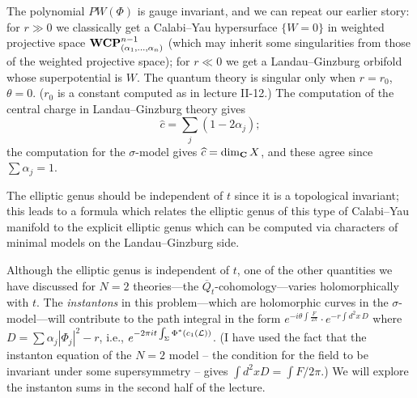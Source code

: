The polynomial $PW(\Phi)$ is gauge invariant, and we can repeat our earlier
story:  for $r\gg0$ we classically
get a Calabi--Yau hypersurface $\{W=0\}$ in weighted projective space ${\bf
WCP}^{n-1}_{(\alpha_1,\dots,\alpha_n)}$
(which may inherit some singularities
from those of the weighted projective space); for $r\ll0$ we get a
Landau--Ginzburg orbifold whose
superpotential is $W$.  The quantum theory is singular only when $r=r_0$,
$\theta=0$.  ($r_0$ is
a constant computed as in lecture II-12.)
The computation of the central charge in Landau--Ginzburg theory gives
$$\widehat{c}=\sum_j(1-2\alpha_j);$$
the computation for the $\sigma$-model gives $\widehat{c}=\dim_{\bf C}X$, and
these agree since
$\sum\alpha_j=1$.

\centerline{\quad}
\centerline{\epsfysize=1.35in}
\centerline{\quad}


The elliptic genus should be independent of $t$ since it is a topological
invariant; this leads to a
formula which relates the elliptic genus of this type of Calabi--Yau manifold
to the explicit
elliptic genus which can be computed via characters of minimal models on the
Landau--Ginzburg side.

Although the elliptic genus is independent of $t$, one of the other quantities
we have discussed for
$N{=}2$ theories---the $\overline{Q}_t$-cohomology---varies holomorphically
with $t$.  The
{\it instantons}\/ in this problem---which are holomorphic curves in the
$\sigma$-model---will
contribute to the path integral in the form
$e^{-i\theta\int\frac{F}{2\pi}}\cdot
 e^{-r\int d^2x\,D}$
where $D=\sum\alpha_j|\Phi_j|^2-r$, i.e., $e^{-2\pi it\int_\Sigma
\Phi^*(c_1({\cal L}))}$.
(I have used the fact that the instanton equation of the $N=2$ model -- the
condition
for the field to be invariant under some supersymmetry -- gives $\int d^2x
D=\int F/2\pi$.)
We will explore the instanton sums in the second half of the lecture.


